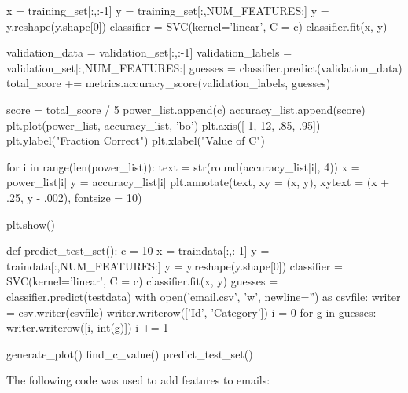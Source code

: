 \documentclass[11pt]{article}
\begin{document}
\begin{python}
            x = training_set[:,:-1]
            y = training_set[:,NUM_FEATURES:]
            y = y.reshape(y.shape[0])
            classifier = SVC(kernel='linear', C = c)
            classifier.fit(x, y)

            validation_data = validation_set[:,:-1]
            validation_labels = validation_set[:,NUM_FEATURES:]
            guesses = classifier.predict(validation_data)
            total_score += metrics.accuracy_score(validation_labels, guesses)

        score = total_score / 5
        power_list.append(c)
        accuracy_list.append(score)
    plt.plot(power_list, accuracy_list, 'bo')
    plt.axis([-1, 12, .85, .95])
    plt.ylabel("Fraction Correct")
    plt.xlabel("Value of C")

    for i in range(len(power_list)):
        text = str(round(accuracy_list[i], 4))
        x = power_list[i]
        y = accuracy_list[i]
        plt.annotate(text, xy = (x, y), xytext = (x + .25, y - .002), fontsize = 10)

    plt.show()

def predict_test_set():
    c = 10
    x = traindata[:,:-1]
    y = traindata[:,NUM_FEATURES:]
    y = y.reshape(y.shape[0])
    classifier = SVC(kernel='linear', C = c)
    classifier.fit(x, y)
    guesses = classifier.predict(testdata)
    with open('email.csv', 'w', newline='') as csvfile:
        writer = csv.writer(csvfile)
        writer.writerow(['Id', 'Category'])
        i = 0
        for g in guesses:
            writer.writerow([i, int(g)])
            i += 1

generate_plot()
find_c_value()
predict_test_set()
\end{python}
\newpage
The following code was used to add features to emails:
\end{document}
